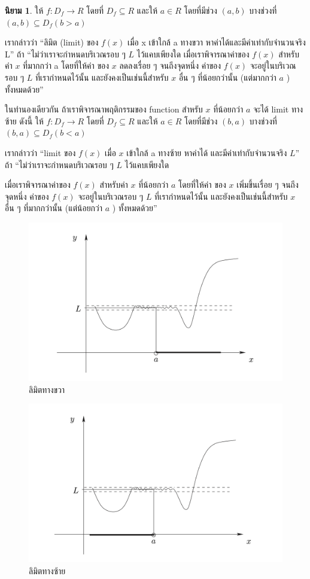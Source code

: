 \documentclass[
]{book}
\theoremstyle{definition}
\newtheorem{definition}{นิยาม}[chapter]
\theoremstyle{definition}
\theoremstyle{definition}
\theoremstyle{definition}
\theoremstyle{remark}
\begin{document}
\begin{definition}
\protect\hypertarget{def:def-limit}{}\label{def:def-limit}ให้ \(f : D_{f}\rightarrow R\) โดยที่ \(D_{f}\subseteq R\) และให้ \(a \in R\)
โดยที่มีช่วง \((a,b)\) บางช่วงที่
\(\left( a,b\right) \subseteq D_{f}\left( b>a\right)\)

เรากล่าวว่า ``ลิมิต (limit) ของ \(f(x)\) เมื่อ x เข้าใกล้ a ทางขวา
หาค่าได้และมีค่าเท่ากับจำนวนจริง L'' ถ้า ``ไม่ว่าเราจะกำหนดบริเวณรอบ ๆ \(L\)
ไว้แคบเพียงใด เมื่อเราพิจารณาค่าของ \(f(x)\) สำหรับค่า \(x\) ที่มากกว่า a โดยที่ให้ค่า ของ
\(x\) ลดลงเรื่อย ๆ จนถีงจุดหนึ่ง ค่าของ \(f(x)\) จะอยู่ในบริเวณรอบ ๆ \(L\) ที่เรากำหนดไว้นั้น
และยังคงเป็นเช่นนี้สำหรับ \(x\) อื่น ๆ ที่น้อยกว่านั้น (แต่มากกว่า \(a\) ) ทั้งหมดด้วย''

ในทำนองเดียวกัน ถ้าเราพิจารณาพฤติกรรมของ function สำหรับ \(x\) ที่น้อยกว่า \(a\) จะได้
limit ทางซ้าย ดังนี้ ให้ \(f : D_{f}\rightarrow R\) โดยที่ \(D_{f}\subseteq R\)
และให้ \(a \in R\) โดยที่มีช่วง \((b,a)\) บางช่วงที่
\(\left( b,a\right) \subseteq D_{f}\left( b<a\right)\)

เรากล่าวว่า ``limit ของ \(f(x)\) เมื่อ \(x\) เข้าใกล้ a ทางซ้าย หาค่าได้
และมีค่าเท่ากับจำนวนจริง \(L\)'' ถ้า ``ไม่ว่าเราจะกำหนดบริเวณรอบ ๆ \(L\) ไว้แคบเพียงใด

เมื่อเราพิจารณาค่าของ \(f(x)\) สำหรับค่า \(x\) ที่น้อยกว่า \(a\) โดยที่ให้ค่า ของ \(x\)
เพิ่มขึ้นเรื่อย ๆ จนถีงจุดหนึ่ง ค่าของ \(f(x)\) จะอยู่ในบริเวณรอบ ๆ \(L\) ที่เรากำหนดไว้นั้น
และยังคงเป็นเช่นนี้สำหรับ \(x\) อื่น ๆ ที่มากกว่านั้น (แต่น้อยกว่า \(a\) ) ทั้งหมดด้วย''
\end{definition}

\begin{figure}

{\centering \includegraphics[width=0.5\linewidth]{images/fig-right-limit} 

}

\caption{ลิมิตทางขวา}\label{fig:fig-right-limit}
\end{figure}

\begin{figure}

{\centering \includegraphics[width=0.5\linewidth]{images/fig-left-limit} 

}

\caption{ลิมิตทางซ้าย}\label{fig:fig-left-limit}
\end{figure}
\end{document}
